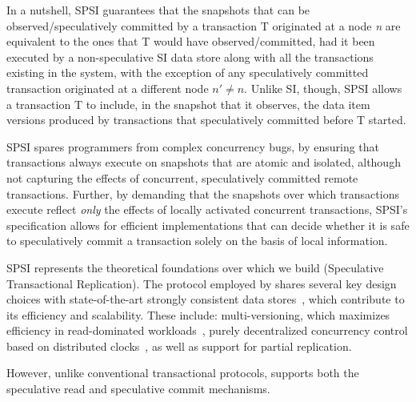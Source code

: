  
In a nutshell, SPSI guarantees that the snapshots that can be observed/speculatively committed by a transaction T originated at a node \textit{n}
 are equivalent to the ones that T would have observed/committed, had it been executed by a non-speculative SI data store along with all the transactions existing in the system, with the exception of any speculatively committed transaction originated at a different node $n'\neq n$. Unlike SI, though, SPSI allows a transaction T to include, in the snapshot that it observes, the data item versions produced by transactions that speculatively committed before T started.
 
SPSI  spares programmers from complex concurrency bugs, by ensuring that  transactions always execute on snapshots that are atomic and isolated, although not capturing the effects of concurrent, speculatively committed remote transactions. Further, by demanding that the snapshots over which transactions execute reflect \textit{only} the effects of locally activated concurrent transactions, SPSI's specification allows for efficient implementations that can decide whether it is safe to speculatively commit a transaction solely on the basis of local information.


SPSI represents the theoretical foundations over which we build \specula (Speculative Transactional Replication). The protocol employed by \specula  shares several key design choices with state-of-the-art strongly consistent data stores~\cite{spanner,clock-si,PelusoScore}, which contribute to its efficiency and scalability. These include:  multi-versioning, which maximizes efficiency in read-dominated workloads~\cite{bernstein-book},  purely decentralized concurrency control based on distributed clocks~\cite{spanner,clock-SI,PelusoGMU}, as well as support for partial replication. 

However, unlike conventional transactional protocols, \specula supports both 
the speculative read and speculative commit mechanisms.
%

